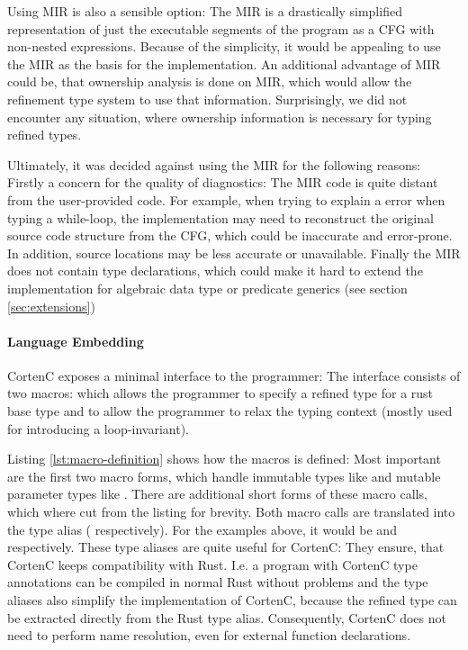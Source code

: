 \documentclass[twoside, english]{sdqthesis}
\theoremstyle{definition}
\begin{document}
Using MIR is also a sensible option: The MIR is a drastically simplified representation of just the executable segments of the program as a CFG with non-nested expressions. Because of the simplicity, it would be appealing to use the MIR as the basis for the implementation. 
An additional advantage of MIR could be, that ownership analysis is done on MIR, which would allow the refinement type system to use that information. Surprisingly, we did not encounter any situation, where ownership information is necessary for typing refined types.

Ultimately, it was decided against using the MIR for the following reasons:
Firstly a concern for the quality of diagnostics: The MIR code is quite distant from the user-provided code. For example, when trying to explain a error when typing a while-loop, the implementation may need to reconstruct the original source code structure from the CFG, which could be inaccurate and error-prone. 
In addition, source locations may be less accurate or unavailable. 
Finally the MIR does not contain type declarations, which could make it hard to extend the implementation for algebraic data type or predicate generics (see section \ref{sec:extensions})

\paragraph{Language Embedding}
CortenC exposes a minimal interface to the programmer: The interface consists of two macros:
 which allows the programmer to specify a refined type for a rust base type and
 to allow the programmer to relax the typing context (mostly used for introducing a loop-invariant). 

Listing \ref{lst:macro-definition} shows how the  macros is defined: Most important are the first two macro forms, which handle immutable types like  and mutable parameter types like . 
There are additional short forms of these macro calls, which where cut from the listing for brevity. Both macro calls are translated into the type alias  ( respectively). For the examples above, it would be  and  respectively. These type aliases are quite useful for CortenC: They ensure, that CortenC keeps compatibility with Rust. I.e. a program with CortenC type annotations can be compiled in normal Rust without problems and the type aliases also simplify the implementation of CortenC, because the refined type can be extracted directly from the Rust type alias. Consequently, CortenC does not need to perform name resolution, even for external function declarations.
\end{document}
